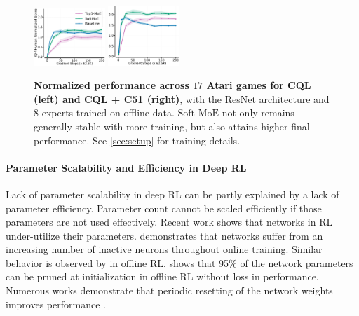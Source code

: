 \documentclass{article}
\theoremstyle{plain}
\theoremstyle{definition}
\theoremstyle{remark}
\newcommand{\softmoe}{$\textrm{Soft MoE}$}
\begin{document}
\ifarxiv
\else
    \begin{figure}[!t]
        \centering
        \includegraphics[width=0.24\textwidth]{figures/MOEs_offlineCQL_experts_8CORRCOLOR2.pdf}%
        \includegraphics[width=0.24\textwidth]{figures/MOEs_offlineCQL+C51_experts_8CORRCOLOR2.pdf}%
        \vspace{-0.4cm}
        \caption{\textbf{Normalized performance across $17$ Atari games for CQL (left) and CQL + C51 (right)}, with the ResNet \citep{espeholt2018impala} architecture and $8$ experts trained on offline data. \softmoe{} not only remains generally stable with more training, but also attains higher final performance. See \cref{sec:setup} for training details.}
        \label{fig:offline_rlMOEs}
        \vspace{-0.2cm}
    \end{figure}
\fi

\paragraph{Parameter Scalability and Efficiency in Deep RL}
Lack of parameter scalability in deep RL can be partly explained by a lack of parameter efficiency. Parameter count cannot be scaled efficiently if those parameters are not used effectively. Recent work shows that networks in RL under-utilize their parameters. \citet{sokar2023dormant} demonstrates that networks suffer from an increasing number of inactive neurons throughout online training. Similar behavior is observed by \citet{gulcehre2022empirical} in offline RL. \citet{arnob2021single} shows that 95\% of the network parameters can be pruned at initialization in offline RL without loss in performance. Numerous works demonstrate that periodic resetting of the network weights improves performance \citep{nikishin22primacy,dohare2021continual,sokar2023dormant,d'oro2022sampleefficient,igl2020transient,schwarzer23bbf}. 
\end{document}
